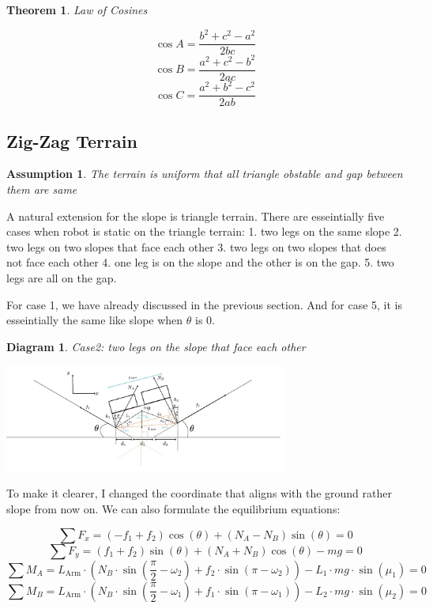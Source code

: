 \documentclass[11pt]{article}
\newtheorem{theorem}[statement]{Theorem}
\newtheorem{assumption}[statement]{Assumption}
\newtheorem{diagram}[statement]{Diagram}
\begin{document}
\begin{theorem}\label{thm:law-of-cosines}
Law of Cosines

\[
\cos A = \frac{b^2 + c^2 - a^2}{2bc}
\]
\[
\cos B = \frac{a^2 + c^2 - b^2}{2ac}
\]
\[
\cos C = \frac{a^2 + b^2 - c^2}{2ab}
\]
\end{theorem}


\subsection*{Zig-Zag Terrain}

\begin{assumption}\label{ass:Zig-Zag-terrain-assumption}
The terrain is uniform that all triangle obstable and gap between them are same
\end{assumption}

A natural extension for the slope is triangle terrain. There are esseintially five cases
when robot is static on the triangle terrain: 1. two legs on the same slope 2. two legs on two slopes that face each other
3. two legs on two slopes that does not face each other 4. one leg is on the slope and the other is on the gap. 5. two legs
are all on the gap. 

For case 1, we have already discussed in the previous section. And for case 5, it is esseintially the same
like slope when \(\theta\) is 0.

\begin{diagram}
    Case2: two legs on the slope that face each other
\end{diagram}
\vspace{1ex} %
\begin{center}
    \includegraphics[width=0.7\textwidth]{figs/Case2.jpg} %
\end{center}

To make it clearer, I changed the coordinate that aligns with the ground rather slope from now on.
We can also formulate the equilibrium equations:

\[ \sum F_x = (-f_1+f_2)\cos(\theta) + (N_A-N_B) \sin(\theta) = 0 \]
\[ \sum F_y = (f_1+f_2)\sin(\theta) + (N_A+N_B) \cos(\theta) - mg = 0 \]
\[ \sum M_A =  L_\text{Arm} \cdot (N_B \cdot \sin(\frac{\pi}{2}-\omega_2) + f_2 \cdot \sin(\pi-\omega_2)) - L_1\cdot mg \cdot \sin(\mu_1)= 0 \]
\[ \sum M_B =  L_\text{Arm} \cdot (N_B \cdot \sin(\frac{\pi}{2}-\omega_1) + f_1 \cdot \sin(\pi-\omega_1)) - L_2\cdot mg \cdot \sin(\mu_2)= 0 \]
\end{document}
